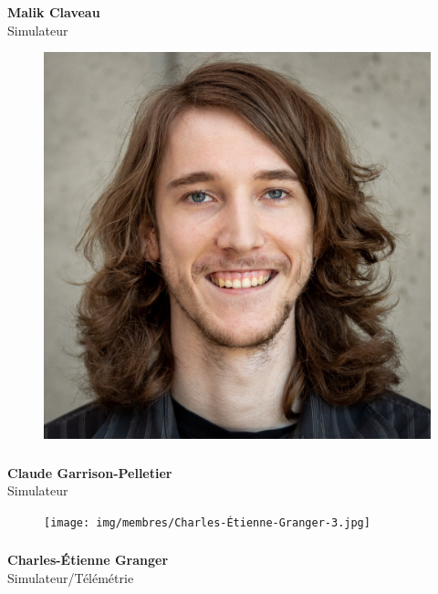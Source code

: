 \documentclass[a0paper,portrait]{baposter}
\begin{document}
\begin{poster}
{\subsubsection*{}
\vspace{2mm}
\textbf{Malik Claveau}\\
Simulateur

\begin{figure}
\includegraphics[width=.9\linewidth]{img/membres/Claude-Garrison-Pelletier-2.jpg} 
\end{figure}
\subsubsection*{}
\vspace{2mm}
\textbf{Claude Garrison-Pelletier}\\
Simulateur

\begin{figure}
\texttt{[image: img/membres/Charles-Étienne-Granger-3.jpg]} 
\end{figure}
\subsubsection*{}
\vspace{2mm}
\textbf{Charles-Étienne Granger}\\
Simulateur/Télémétrie

}
\end{poster}
\end{document}
